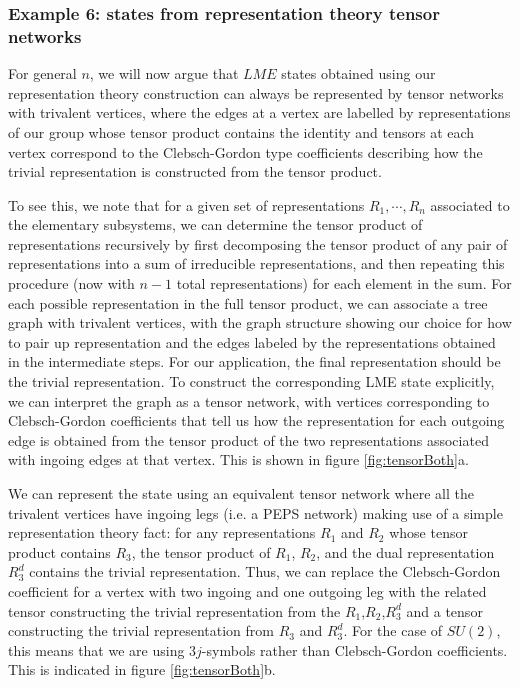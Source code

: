 \documentclass[12pt]{article}
\theoremstyle{definition}
\begin{document}
\subsubsection*{Example 6: states from representation theory tensor networks}

For general $n$, we will now argue that $LME$ states obtained using our representation theory construction can always be represented by tensor networks with trivalent vertices, where the edges at a vertex are labelled by representations of our group whose tensor product contains the identity and tensors at each vertex correspond to the Clebsch-Gordon type coefficients describing how the trivial representation is constructed from the tensor product.

To see this, we note that for a given set of representations $R_1, \cdots, R_n$ associated to the elementary subsystems, we can determine the tensor product of representations recursively by first decomposing the tensor product of any pair of representations into a sum of irreducible representations, and then repeating this procedure (now with $n-1$ total representations) for each element in the sum. For each possible representation in the full tensor product, we can associate a tree graph with trivalent vertices, with the graph structure showing our choice for how to pair up representation and the edges labeled by the representations obtained in the intermediate steps. For our application, the final representation should be the trivial representation. To construct the corresponding LME state explicitly, we can interpret the graph as a tensor network, with vertices corresponding to Clebsch-Gordon coefficients that tell us how the representation for each outgoing edge is obtained from the tensor product of the two representations associated with ingoing edges at that vertex. This is shown in figure \ref{fig:tensorBoth}a.

We can represent the state using an equivalent tensor network where all the trivalent vertices have ingoing legs (i.e. a PEPS network) making use of a simple representation theory fact: for any representations $R_1$ and $R_2$ whose tensor product contains $R_3$, the tensor product of $R_1$, $R_2$, and the dual representation $R_3^d$ contains the trivial representation. Thus, we can replace the Clebsch-Gordon coefficient for a vertex with two ingoing and one outgoing leg with the related tensor constructing the trivial representation from the $R_1$,$R_2$,$R_3^d$ and a tensor constructing the trivial representation from $R_3$ and $R_3^d$. For the case of $SU(2)$, this means that we are using $3j$-symbols rather than Clebsch-Gordon coefficients. This is indicated in figure \ref{fig:tensorBoth}b.
\end{document}
